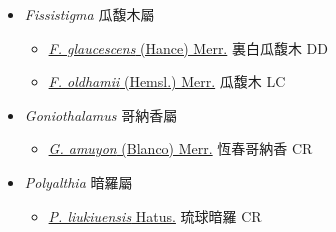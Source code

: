 
  \begin{itemize}
 \item[] \textit{Fissistigma} 瓜馥木屬
                                
  \begin{itemize}
        \item[] \href{http://www.theplantlist.org/tpl1.1/search?q=Fissistigma+glaucescens}{\textit{F. glaucescens} (Hance) Merr.}   裏白瓜馥木   DD
        \item[] \href{http://www.theplantlist.org/tpl1.1/search?q=Fissistigma+oldhamii}{\textit{F. oldhamii} (Hemsl.) Merr.}   瓜馥木   LC
  \end{itemize}
 \item[] \textit{Goniothalamus} 哥納香屬
                                
  \begin{itemize}
        \item[] \href{http://www.theplantlist.org/tpl1.1/search?q=Goniothalamus+amuyon}{\textit{G. amuyon} (Blanco) Merr.}   恆春哥納香   CR
  \end{itemize}
 \item[] \textit{Polyalthia} 暗羅屬
                                
  \begin{itemize}
        \item[] \href{http://www.theplantlist.org/tpl1.1/search?q=Polyalthia+liukiuensis}{\textit{P. liukiuensis} Hatus.}   琉球暗羅   CR
  \end{itemize}
  \end{itemize}
